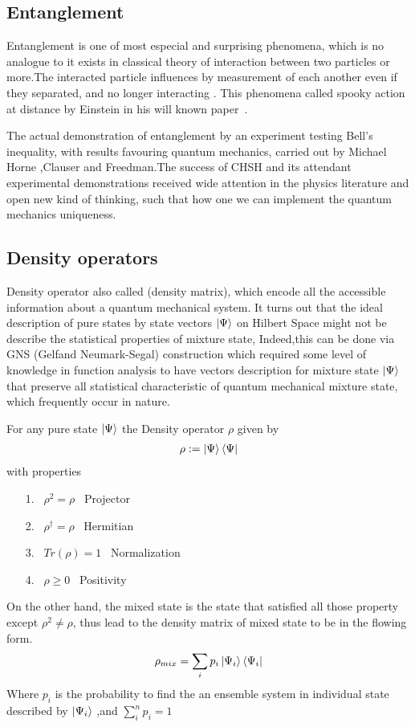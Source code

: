 \subsection{Entanglement}


Entanglement is one of most especial and surprising phenomena, which is no analogue to it exists in classical theory of  interaction between two particles or more\citep{PhysRevLett.78.5022}.The interacted particle influences by measurement of each another even if they separated,  and no longer interacting . This phenomena  called spooky action at distance by Einstein in his will known paper~\cite{EPR}.


The actual demonstration of entanglement by an experiment testing Bell’s inequality, with results favouring quantum mechanics, carried out by Michael Horne ,Clauser and Freedman\citep{PhysRevLett.23.880}.The success of CHSH and its attendant experimental demonstrations received wide attention in the physics literature and open new kind of thinking, such that how one we can implement the quantum mechanics uniqueness.
\subsection{Density operators}
Density operator also called (density matrix), which encode all the accessible information about a quantum mechanical system.  It turns out that the ideal description of pure states by state vectors $\ket{\Psi}$  on Hilbert Space might not be describe the statistical properties of mixture state, Indeed,this can be done via  GNS (Gelfand Neumark-Segal)  construction \citep{book:72351}which required some level of knowledge in function analysis  to have  vectors description  for  mixture state  $\ket{\Psi}$ that preserve all statistical characteristic of quantum mechanical mixture state, which frequently occur in nature.

For any pure state $\ket{\Psi}$ the Density operator $\rho$ given by
\begin{align}
\rho:=\ket{\Psi}\bra{\Psi}
\end{align}
with properties 
\begin{itemize}
\item[1.] ~$\rho^2=\rho$ ~Projector 
\item [2.]~$\rho^\dagger =\rho$ ~Hermitian
\item [3.]~$Tr(\rho)=1$ ~Normalization
\item [4.]~$\rho \geqslant 0$ ~Positivity
\end{itemize}
On the other hand, the mixed state is the state that satisfied all those property except $\rho^2\neq\rho$, thus lead to the density matrix of mixed state to be in the flowing form.
\begin{equation}
\rho_{mix }= \sum_{i} p_i \ket{\Psi_i}\bra{\Psi_i}
\end{equation}
Where $p_i$ is the probability to find the an ensemble  system in individual state  described by $\ket{\Psi_i} $ ,and $\sum_{i}^n p_i=1$

